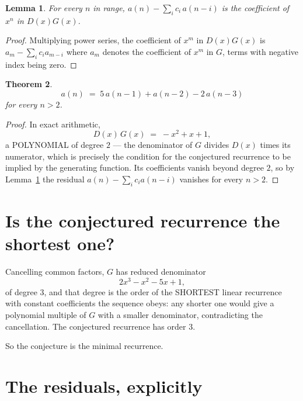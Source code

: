\documentclass[11pt,a4paper]{article}
\theoremstyle{plain}
\newtheorem{theorem}{Theorem}
\newtheorem{lemma}[theorem]{Lemma}
\theoremstyle{definition}
\begin{document}
\begin{lemma}\label{lem:key}
For every $n$ in range, $a(n)-\sum_i c_i\,a(n-i)$ is the coefficient of $x^{n}$ in
$D(x)G(x)$.
\end{lemma}

\begin{proof}
Multiplying power series, the coefficient of $x^{m}$ in $D(x)G(x)$ is
$a_m-\sum_i c_i a_{m-i}$ where $a_m$ denotes the coefficient of $x^{m}$ in $G$, terms with
negative index being zero.
\end{proof}

\begin{theorem}
\[
a(n)\;=\;5\,a(n-1) + a(n-2) - 2\,a(n-3)
\]
for every $n>2$.
\end{theorem}

\begin{proof}
In exact arithmetic,
\[
D(x)\,G(x)\;=\;- x^{2} + x + 1,
\]
a POLYNOMIAL of degree $2$ --- the denominator of $G$ divides $D(x)$ times its numerator,
which is precisely the condition for the conjectured recurrence to be implied by the
generating function. Its coefficients vanish beyond degree $2$, so by
Lemma~\ref{lem:key} the residual $a(n)-\sum_ic_ia(n-i)$ vanishes for every
$n>2$.
\end{proof}

\section{Is the conjectured recurrence the shortest one?}

Cancelling common factors, $G$ has reduced denominator
\[
2 x^{3} - x^{2} - 5 x + 1,
\]
of degree $3$, and that degree is the order of the SHORTEST linear recurrence with
constant coefficients the sequence obeys: any shorter one would give a polynomial multiple of
$G$ with a smaller denominator, contradicting the cancellation. The conjectured recurrence has
order $3$.

So the conjecture is the minimal recurrence.

\section{The residuals, explicitly}
\end{document}

